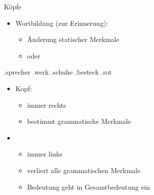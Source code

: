 \begin{frame}
  {Köpfe}
  \pause
  \begin{itemize}[<+->]
    \item Wortbildung (zur Erinnerung):
      \begin{itemize}[<+->]
        \item Änderung statischer Merkmale
        \item oder 
      \end{itemize}
      \Viertelzeile
  \end{itemize}
  \pause
  \begin{exe}
    \ex
    \begin{xlist}
      \ex {}.\alert<7->{sprecher} 
      \pause
      \pause
      \pause
      \ex {}.\alert<10->{werk} 
      \pause
      \pause
      \pause
      \ex {}.\alert<13->{schuhe} 
      \pause
      \pause
      \pause
      \ex {}.\alert<16->{besteck} 
      \pause
      \pause
      \pause
      \ex {}.\alert<19->{rot} 
      \pause
      \pause
    \end{xlist}
  \end{exe}
  \pause
  \begin{itemize}[<+->]
    \item \alert{Kopf}:
      \begin{itemize}[<+->]
        \item immer rechts
        \item bestimmt grammatische Merkmale
      \end{itemize}
    \item {}
      \begin{itemize}[<+->]
        \item immer links
        \item verliert alle grammatischen Merkmale
        \item Bedeutung geht in Gesamtbedeutung ein
      \end{itemize}
  \end{itemize}
\end{frame}

